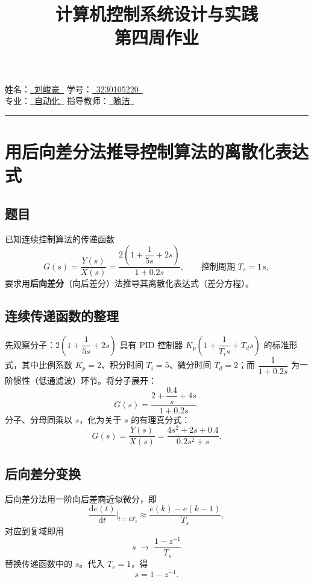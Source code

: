 \documentclass[12pt,a4paper]{ctexart}
\title{\textbf{计算机控制系统设计与实践\\ 第四周作业}}
\author{}
\date{}
\begin{document}
\maketitle

\noindent
姓\quad 名：\underline{\ 刘峻豪\ }\hspace{4em} 学\quad 号：\underline{\ 3230105220\ }\\[1.2ex]
专\quad 业：\underline{\ 自动化\ }\hspace{4em} 指导教师：\underline{\ 喻洁\ }

\bigskip
\hrule
\bigskip

\section{用后向差分法推导控制算法的离散化表达式}

\subsection{题目}
已知连续控制算法的传递函数
\begin{equation}
G(s)=\frac{Y(s)}{X(s)}=\frac{2\left(1+\dfrac{1}{5s}+2s\right)}{1+0.2s},
\qquad \text{控制周期 } T_s=1\,\mathrm{s},
\end{equation}
要求用\textbf{后向差分}（向后差分）法推导其离散化表达式（差分方程）。

\subsection{连续传递函数的整理}
先观察分子：$2\left(1+\dfrac{1}{5s}+2s\right)$ 具有 PID 控制器
$K_p\left(1+\dfrac{1}{T_i s}+T_d s\right)$ 的标准形式，其中比例系数 $K_p=2$、积分时间
$T_i=5$、微分时间 $T_d=2$；而 $\dfrac{1}{1+0.2s}$ 为一阶惯性（低通滤波）环节。将分子展开：
\begin{equation}
G(s)=\frac{2+\dfrac{0.4}{s}+4s}{1+0.2s}.
\end{equation}
分子、分母同乘以 $s$，化为关于 $s$ 的有理真分式：
\begin{equation}
G(s)=\frac{Y(s)}{X(s)}=\frac{4s^{2}+2s+0.4}{0.2s^{2}+s}.
\end{equation}

\subsection{后向差分变换}
后向差分法用一阶向后差商近似微分，即
\begin{equation}
\frac{\mathrm{d}e(t)}{\mathrm{d}t}\bigg|_{t=kT_s}\approx\frac{e(k)-e(k-1)}{T_s},
\end{equation}
对应到复域即用
\begin{equation}
s\;\longrightarrow\;\frac{1-z^{-1}}{T_s}
\end{equation}
替换传递函数中的 $s$。代入 $T_s=1$，得
\begin{equation}
s=1-z^{-1}.
\end{equation}
\end{document}
